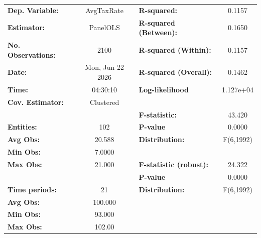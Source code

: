 \begin{center}
\begin{tabular}{lclc}
\toprule
\textbf{Dep. Variable:}                       &     AvgTaxRate     & \textbf{  R-squared:         }   &      0.1157      \\
\textbf{Estimator:}                           &      PanelOLS      & \textbf{  R-squared (Between):}  &      0.1650      \\
\textbf{No. Observations:}                    &        2100        & \textbf{  R-squared (Within):}   &      0.1157      \\
\textbf{Date:}                                &  Mon, Jun 22 2026  & \textbf{  R-squared (Overall):}  &      0.1462      \\
\textbf{Time:}                                &      04:30:10      & \textbf{  Log-likelihood     }   &    1.127e+04     \\
\textbf{Cov. Estimator:}                      &     Clustered      & \textbf{                     }   &                  \\
\textbf{}                                     &                    & \textbf{  F-statistic:       }   &      43.420      \\
\textbf{Entities:}                            &        102         & \textbf{  P-value            }   &      0.0000      \\
\textbf{Avg Obs:}                             &       20.588       & \textbf{  Distribution:      }   &    F(6,1992)     \\
\textbf{Min Obs:}                             &       7.0000       & \textbf{                     }   &                  \\
\textbf{Max Obs:}                             &       21.000       & \textbf{  F-statistic (robust):} &      24.322      \\
\textbf{}                                     &                    & \textbf{  P-value            }   &      0.0000      \\
\textbf{Time periods:}                        &         21         & \textbf{  Distribution:      }   &    F(6,1992)     \\
\textbf{Avg Obs:}                             &      100.000       & \textbf{                     }   &                  \\
\textbf{Min Obs:}                             &       93.000       & \textbf{                     }   &                  \\
\textbf{Max Obs:}                             &       102.00       & \textbf{                     }   &                  \\

\end{tabular}
\end{center}
